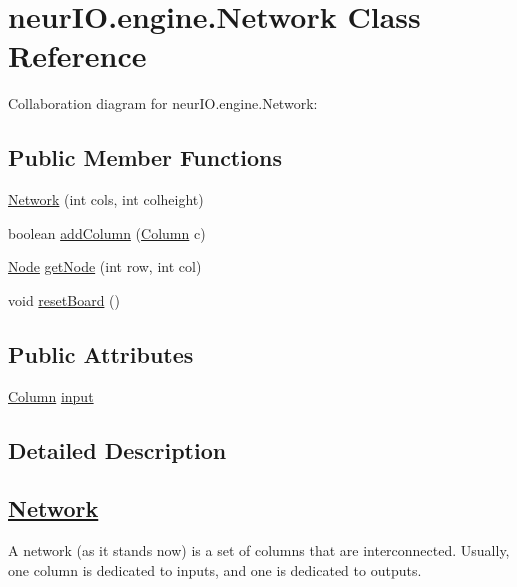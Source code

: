 \hypertarget{classneur_i_o_1_1engine_1_1_network}{}\section{neur\+I\+O.\+engine.\+Network Class Reference}
\label{classneur_i_o_1_1engine_1_1_network}


Collaboration diagram for neur\+I\+O.\+engine.\+Network\+:
\subsection*{Public Member Functions}
\begin{DoxyCompactItemize}
\item 
\hyperlink{classneur_i_o_1_1engine_1_1_network_a33df63f4e69799f58a0c36e953c92ab0}{Network} (int cols, int colheight)
\item 
boolean \hyperlink{classneur_i_o_1_1engine_1_1_network_ad46d0fee3e111e29a03431f5591eaf79}{add\+Column} (\hyperlink{classneur_i_o_1_1engine_1_1_column}{Column} c)
\item 
\hyperlink{classneur_i_o_1_1system_1_1_node}{Node} \hyperlink{classneur_i_o_1_1engine_1_1_network_a1b0ab79360a41695de4b06df2c7974e0}{get\+Node} (int row, int col)
\item 
void \hyperlink{classneur_i_o_1_1engine_1_1_network_a1d96332ab8340f429e6aedbd5180fc35}{reset\+Board} ()
\end{DoxyCompactItemize}
\subsection*{Public Attributes}
\begin{DoxyCompactItemize}
\item 
\hyperlink{classneur_i_o_1_1engine_1_1_column}{Column} \hyperlink{classneur_i_o_1_1engine_1_1_network_a385e3964dd1f88834f266e4b3cc40e1c}{input}
\end{DoxyCompactItemize}


\subsection{Detailed Description}
\subsection*{\hyperlink{classneur_i_o_1_1engine_1_1_network}{Network} }

A network (as it stands now) is a set of columns that are interconnected. Usually, one column is dedicated to inputs, and one is dedicated to outputs. 

